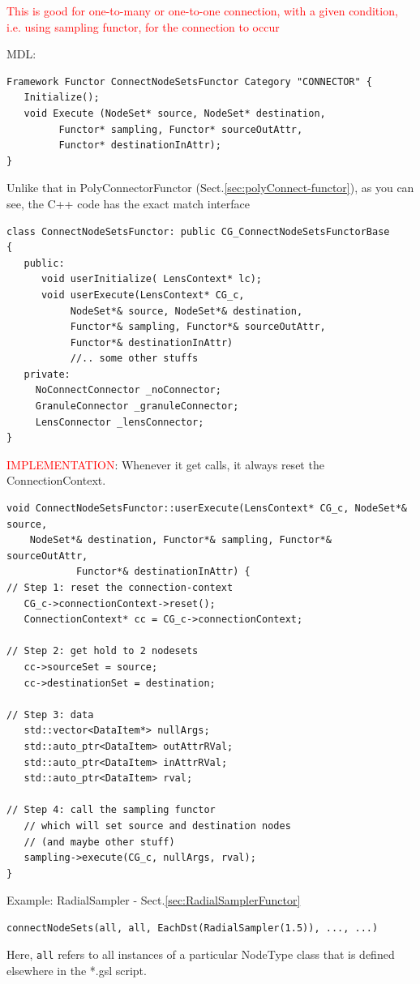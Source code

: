 \textcolor{red}{This is good for one-to-many or one-to-one connection, with a
given condition, i.e. using sampling functor, for the connection to occur}

MDL:
\begin{verbatim}
Framework Functor ConnectNodeSetsFunctor Category "CONNECTOR" {
   Initialize();
   void Execute (NodeSet* source, NodeSet* destination, 
		 Functor* sampling, Functor* sourceOutAttr, 
		 Functor* destinationInAttr);
}

\end{verbatim}

Unlike that in PolyConnectorFunctor (Sect.\ref{sec:polyConnect-functor}), as
you can see, the C++ code has the exact match interface
\begin{verbatim}
class ConnectNodeSetsFunctor: public CG_ConnectNodeSetsFunctorBase
{
   public:
      void userInitialize( LensContext* lc);
      void userExecute(LensContext* CG_c, 
           NodeSet*& source, NodeSet*& destination, 
           Functor*& sampling, Functor*& sourceOutAttr,
           Functor*& destinationInAttr) 
           //.. some other stuffs
   private:
     NoConnectConnector _noConnector;
     GranuleConnector _granuleConnector;
     LensConnector _lensConnector;   
}
\end{verbatim}


\textcolor{red}{IMPLEMENTATION}: Whenever it get calls, it always reset the
ConnectionContext.

{\tiny
\begin{lstlisting}
void ConnectNodeSetsFunctor::userExecute(LensContext* CG_c, NodeSet*& source, 
    NodeSet*& destination, Functor*& sampling, Functor*& sourceOutAttr,
            Functor*& destinationInAttr) {
// Step 1: reset the connection-context
   CG_c->connectionContext->reset();
   ConnectionContext* cc = CG_c->connectionContext;

// Step 2: get hold to 2 nodesets
   cc->sourceSet = source;
   cc->destinationSet = destination;

// Step 3: data 
   std::vector<DataItem*> nullArgs;
   std::auto_ptr<DataItem> outAttrRVal;
   std::auto_ptr<DataItem> inAttrRVal;
   std::auto_ptr<DataItem> rval;

// Step 4: call the sampling functor
   // which will set source and destination nodes 
   // (and maybe other stuff)
   sampling->execute(CG_c, nullArgs, rval);
}
\end{lstlisting}
}



Example: RadialSampler - Sect.\ref{sec:RadialSamplerFunctor}
\begin{verbatim}
connectNodeSets(all, all, EachDst(RadialSampler(1.5)), ..., ...)
\end{verbatim}
Here, \verb!all! refers to all instances of a particular NodeType class that is
defined elsewhere in the *.gsl script.

